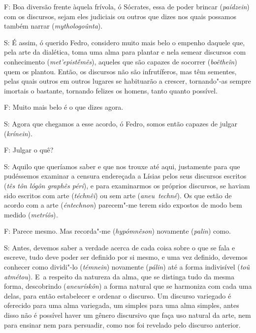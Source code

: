 \bekker{[276e]} F: Boa diversão frente àquela frívola, ó Sócrates, essa de
poder brincar (\emph{paídzein}) com os discursos, sejam eles judiciais
ou outros que dizes nos quais possamos também narrar
(\emph{mythologoûnta}).

 

S: É assim, ó querido Fedro, considero muito mais belo o empenho daquele
que, pela arte da dialética, toma uma alma para plantar e nela semear
discursos com conhecimento (\emph{met'epistḗmês}), \bekker{[277a]} aqueles
que são capazes de socorrer (\emph{boêtheîn}) quem os plantou. Então, os
discursos não são infrutíferos, mas têm sementes, pelas quais outros em
outros lugares se habituarão a crescer, tornando"-as sempre imortais o
bastante, tornando felizes os homens, tanto quanto possível.

 

F: Muito mais belo é o que dizes agora.

 

S: Agora que chegamos a esse acordo, ó Fedro, somos então capazes de
julgar (\emph{krínein}).

 

F: Julgar o quê?

 

S: Aquilo que queríamos saber e que nos trouxe até aqui, justamente para
que pudéssemos examinar a censura endereçada a Lísias pelos seus
discursos escritos (\emph{tês tôn lógôn graphês péri}), \bekker{[277b]} e
para examinarmos os próprios discursos, se haviam sido escritos com arte
(\emph{téchnêi}) ou sem arte (\emph{aneu~techné}). Os que estão de
acordo com a arte (\emph{éntechnon}) parecem"-me terem sido expostos de
modo bem medido (\emph{metríôs})\emph{.}

 

F: Parece mesmo. Mas recorda"-me (\emph{hypómnêson}) novamente
(\emph{palin}) como.

 

S: Antes, devemos saber a verdade acerca de cada coisa sobre o que se
fala e escreve, tudo deve poder ser definido por si mesmo, e uma vez
definido, devemos conhecer como dividi"-lo (\emph{témnein}) novamente
(\emph{pálin}) até a forma indivisível (\emph{toû atmétou}). E~a
respeito da natureza da alma, que se distinga tudo da mesma forma,
\bekker{[277c]} descobrindo (\emph{aneurískôn}) a forma natural que se
harmoniza com cada uma delas, para então estabelecer e ordenar o
discurso. Um discurso variegado é oferecido para uma alma variegada, um
simples para uma alma simples, antes disso não é possível haver um
gênero discursivo que faça uso natural da arte, nem para ensinar nem
para persuadir, como nos foi revelado pelo discurso anterior.

